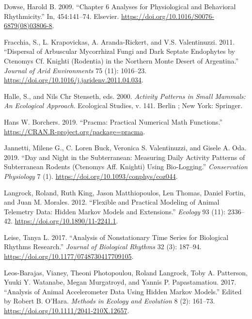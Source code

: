 \documentclass[english,msc,numbers,hidelinks]{coppe}
\newlength{\cslhangindent}
\newenvironment{CSLReferences}[2] %
 {%
  \setlength{\parindent}{0pt}
  \ifodd #1 \everypar{\setlength{\hangindent}{\cslhangindent}}\ignorespaces\fi
  \ifnum #2 > 0
  \setlength{\parskip}{#2\baselineskip}
  \fi
 }%
 {}
\begin{document}
\begin{CSLReferences}{1}{0}
  \leavevmode{}%
  Dowse, Harold B. 2009. {``Chapter 6 Analyses for Physiological and Behavioral Rhythmicity.''} In, 454:141--74. Elsevier. \url{https://doi.org/10.1016/S0076-6879(08)03806-8}.

  \leavevmode{}%
  Fracchia, S., L. Krapovickas, A. Aranda-Rickert, and V.S. Valentinuzzi. 2011. {``Dispersal of Arbuscular Mycorrhizal Fungi and Dark Septate Endophytes by Ctenomys Cf. Knighti (Rodentia) in the Northern Monte Desert of Argentina.''} \emph{Journal of Arid Environments} 75 (11): 1016--23. \url{https://doi.org/10.1016/j.jaridenv.2011.04.034}.

  \leavevmode{}%
  Halle, S., and Nils Chr Stenseth, eds. 2000. \emph{Activity Patterns in Small Mammals: An Ecological Approach}. Ecological Studies, v. 141. Berlin ; New York: Springer.

  \leavevmode{}%
  Hans W. Borchers. 2019. {``Pracma: Practical Numerical Math Functions.''} \url{https://CRAN.R-project.org/package=pracma}.

  \leavevmode{}%
  Jannetti, Milene G., C. Loren Buck, Veronica S. Valentinuzzi, and Gisele A. Oda. 2019. {``Day and Night in the Subterranean: Measuring Daily Activity Patterns of Subterranean Rodents (Ctenomys Aff. Knighti) Using Bio-Logging.''} \emph{Conservation Physiology} 7 (1). \url{https://doi.org/10.1093/conphys/coz044}.

  \leavevmode{}%
  Langrock, Roland, Ruth King, Jason Matthiopoulos, Len Thomas, Daniel Fortin, and Juan M. Morales. 2012. {``Flexible and Practical Modeling of Animal Telemetry Data: Hidden Markov Models and Extensions.''} \emph{Ecology} 93 (11): 2336--42. \url{https://doi.org/10.1890/11-2241.1}.

  \leavevmode{}%
  Leise, Tanya L. 2017. {``Analysis of Nonstationary Time Series for Biological Rhythms Research.''} \emph{Journal of Biological Rhythms} 32 (3): 187--94. \url{https://doi.org/10.1177/0748730417709105}.

  \leavevmode{}%
  Leos-Barajas, Vianey, Theoni Photopoulou, Roland Langrock, Toby A. Patterson, Yuuki Y. Watanabe, Megan Murgatroyd, and Yannis P. Papastamatiou. 2017. {``Analysis of Animal Accelerometer Data Using Hidden Markov Models.''} Edited by Robert B. O'Hara. \emph{Methods in Ecology and Evolution} 8 (2): 161--73. \url{https://doi.org/10.1111/2041-210X.12657}.


\end{CSLReferences}
\end{document}
